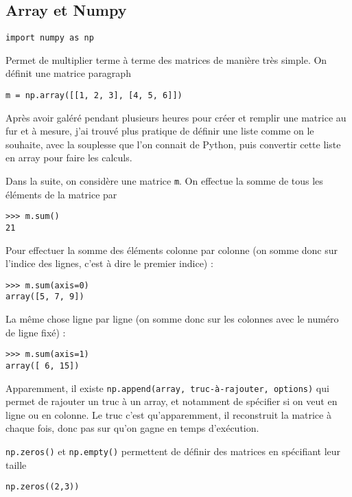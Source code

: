 \documentclass[a4paper,twoside]{article}
\begin{document}
\subsection{Array et Numpy}
\begin{verbatim}
import numpy as np
\end{verbatim}

Permet de multiplier terme à terme des matrices de manière très simple. On définit une matrice paragraph
\begin{verbatim}
m = np.array([[1, 2, 3], [4, 5, 6]])
\end{verbatim}

Après avoir galéré pendant plusieurs heures pour créer et remplir une matrice au fur et à mesure, j'ai trouvé plus pratique de définir une liste comme on le souhaite, avec la souplesse que l'on connait de Python, puis convertir cette liste en array pour faire les calculs.

\bigskip

Dans la suite, on considère une matrice \texttt{m}. On effectue la somme de tous les éléments de la matrice par
\begin{verbatim}
>>> m.sum()
21
\end{verbatim}

Pour effectuer la somme des éléments colonne par colonne (on somme donc sur l'indice des lignes, c'est à dire le premier indice) :
\begin{verbatim}
>>> m.sum(axis=0)
array([5, 7, 9])
\end{verbatim}

La même chose ligne par ligne (on somme donc sur les colonnes avec le numéro de ligne fixé) :
\begin{verbatim}
>>> m.sum(axis=1)
array([ 6, 15])
\end{verbatim}

\begin{remarque}
Apparemment, il existe \texttt{np.append(array, truc-à-rajouter, options)} qui permet de rajouter un truc à un array, et notamment de spécifier si on veut en ligne ou en colonne. Le truc c'est qu'apparemment, il reconstruit la matrice à chaque fois, donc pas sur qu'on gagne en temps d'exécution.
\end{remarque}

\texttt{np.zeros()} et \texttt{np.empty()} permettent de définir des matrices en spécifiant leur taille
\begin{verbatim}
np.zeros((2,3))
\end{verbatim}
\end{document}
